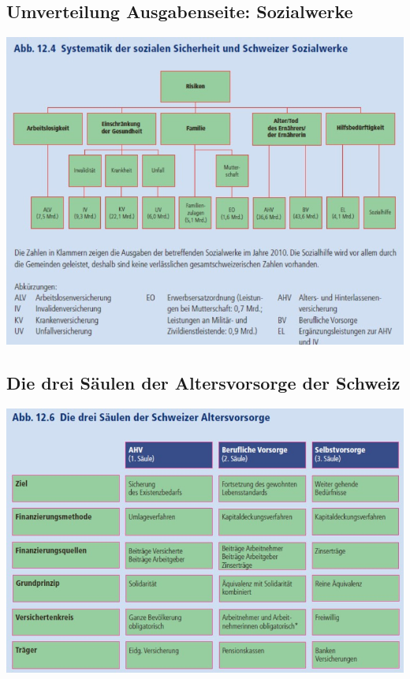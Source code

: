 \subsection{Umverteilung Ausgabenseite: Sozialwerke}
\includegraphics[width=0.8\linewidth]{images/sozialwerke.jpg}
\subsection{Die drei Säulen der Altersvorsorge der Schweiz}
\includegraphics[width=0.8\linewidth]{images/dreisaulen.jpg}
\clearpage
\pagebreak